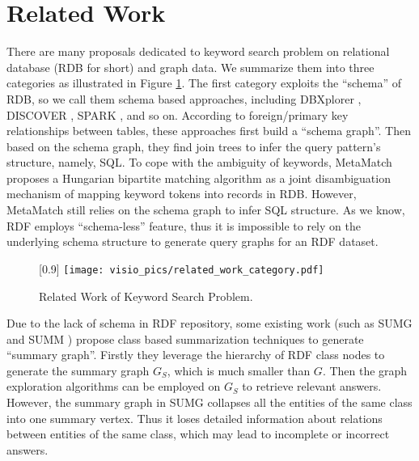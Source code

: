 \section{Related Work} \label{sec:related_work}

There are many proposals dedicated to keyword search problem on relational database (RDB for short) and graph data. We summarize them into three categories as illustrated in Figure \ref{fig:related_work_category}. The first category exploits the ``schema'' of RDB, so we call them schema based approaches, including DBXplorer \cite{agrawal2002dbxplorer}, DISCOVER \cite{hristidis2002discover}, SPARK \cite{luo2007spark}, and so on. According to foreign/primary key relationships between tables, these approaches first build a ``schema graph''. Then based on the schema graph, they find join trees to infer the query pattern's structure, namely, SQL. 
To cope with the ambiguity of keywords, MetaMatch \cite{bergamaschi2011keyword} proposes a Hungarian bipartite matching algorithm as a joint disambiguation mechanism of mapping keyword tokens into records in RDB. However, MetaMatch still relies on the schema graph to infer SQL structure. As we know, RDF employs ``schema-less'' feature, thus it is impossible to rely on the underlying schema structure to generate query graphs for an RDF dataset.  

\begin{figure} [t]
	\centering
	\scalebox{0.8}[0.9]
	{
		\resizebox{\linewidth}{!}
		{
			\texttt{[image: visio\_pics/related\_work\_category.pdf]}
		}
	}
	\caption{Related Work of Keyword Search Problem.}
	\label{fig:related_work_category}
	\vspace{-0.2in}
\end{figure}

Due to the lack of schema in RDF repository, some existing work (such as SUMG \cite{tran2009top} and SUMM \cite{le2014scalable}) propose class based summarization techniques to generate ``summary graph''. Firstly they leverage the hierarchy of RDF class nodes to generate the summary graph $G_S$, which is much smaller than $G$. Then the graph exploration algorithms can be employed on $G_S$ to retrieve relevant answers. However, the summary graph in SUMG collapses all the entities of the same class into one summary vertex. Thus it loses detailed information about relations between entities of the same class, which may lead to incomplete or incorrect answers.


